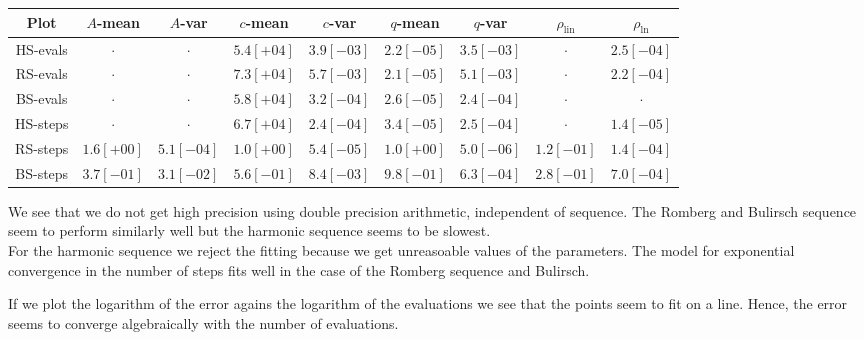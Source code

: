 \begin{table}[H]
    \centering
    \small
    \begin{tabular}{c||c|c|c|c|c|c|c|c}
Plot & \(A\)-mean & \(A\)-var & \(c\)-mean & \(c\)-var & \(q\)-mean & \(q\)-var & \(\rho_{\operatorname{lin}}\) & \(\rho_{\ln}\)\\\hline
\rowcolor{red}
HS-evals & \(\cdot\) & \(\cdot\) & \(5.4[+04]\) & \(3.9[-03]\) & \(2.2[-05]\) & \(3.5[-03]\) & \(\cdot\) & \(2.5[-04]\) \\
\rowcolor{red}
RS-evals & \(\cdot\) & \(\cdot\) & \(7.3[+04]\) & \(5.7[-03]\) & \(2.1[-05]\) & \(5.1[-03]\) & \(\cdot\) & \(2.2[-04]\) \\
\rowcolor{red}
BS-evals & \(\cdot\) & \(\cdot\) & \(5.8[+04]\) & \(3.2[-04]\) & \(2.6[-05]\) & \(2.4[-04]\) & \(\cdot\) & \(\cdot\) \\
\rowcolor{red}
HS-steps & \(\cdot\) & \(\cdot\) & \(6.7[+04]\) & \(2.4[-04]\) & \(3.4[-05]\) & \(2.5[-04]\) & \(\cdot\) & \(1.4[-05]\) \\
\rowcolor{green}
RS-steps & \(1.6[+00]\) & \(5.1[-04]\) & \(1.0[+00]\) & \(5.4[-05]\) & \(1.0[+00]\) & \(5.0[-06]\) & \(1.2[-01]\) & \(1.4[-04]\) \\
\rowcolor{green}
BS-steps & \(3.7[-01]\) & \(3.1[-02]\) & \(5.6[-01]\) & \(8.4[-03]\) & \(9.8[-01]\) & \(6.3[-04]\) & \(2.8[-01]\) & \(7.0[-04]\) \\
    \end{tabular}
    \label{tab:my_label}
\end{table}

We see that we do not get high precision using double precision arithmetic, independent of sequence. The Romberg and Bulirsch sequence seem to perform similarly well but the harmonic sequence seems to be slowest.\\

For the harmonic sequence we reject the fitting because we get unreasoable values of the parameters. The model for exponential convergence in the number of steps fits well in the case of the Romberg sequence and Bulirsch.

If we plot the logarithm of the error agains the logarithm of the evaluations we see that the points seem to fit on a line. Hence, the error seems to converge algebraically with the number of evaluations.

